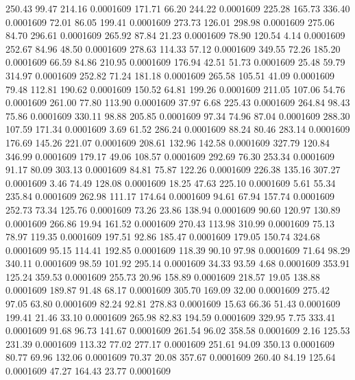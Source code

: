  250.43   99.47  214.16   0.0001609
 171.71   66.20  244.22   0.0001609
 225.28  165.73  336.40   0.0001609
  72.01   86.05  199.41   0.0001609
 273.73  126.01  298.98   0.0001609
 275.06   84.70  296.61   0.0001609
 265.92   87.84   21.23   0.0001609
  78.90  120.54    4.14   0.0001609
 252.67   84.96   48.50   0.0001609
 278.63  114.33   57.12   0.0001609
 349.55   72.26  185.20   0.0001609
  66.59   84.86  210.95   0.0001609
 176.94   42.51   51.73   0.0001609
  25.48   59.79  314.97   0.0001609
 252.82   71.24  181.18   0.0001609
 265.58  105.51   41.09   0.0001609
  79.48  112.81  190.62   0.0001609
 150.52   64.81  199.26   0.0001609
 211.05  107.06   54.76   0.0001609
 261.00   77.80  113.90   0.0001609
  37.97    6.68  225.43   0.0001609
 264.84   98.43   75.86   0.0001609
 330.11   98.88  205.85   0.0001609
  97.34   74.96   87.04   0.0001609
 288.30  107.59  171.34   0.0001609
   3.69   61.52  286.24   0.0001609
  88.24   80.46  283.14   0.0001609
 176.69  145.26  221.07   0.0001609
 208.61  132.96  142.58   0.0001609
 327.79  120.84  346.99   0.0001609
 179.17   49.06  108.57   0.0001609
 292.69   76.30  253.34   0.0001609
  91.17   80.09  303.13   0.0001609
  84.81   75.87  122.26   0.0001609
 226.38  135.16  307.27   0.0001609
   3.46   74.49  128.08   0.0001609
  18.25   47.63  225.10   0.0001609
   5.61   55.34  235.84   0.0001609
 262.98  111.17  174.64   0.0001609
  94.61   67.94  157.74   0.0001609
 252.73   73.34  125.76   0.0001609
  73.26   23.86  138.94   0.0001609
  90.60  120.97  130.89   0.0001609
 266.86   19.94  161.52   0.0001609
 270.43  113.98  310.99   0.0001609
  75.13   78.97  119.35   0.0001609
 197.51   92.86  185.47   0.0001609
 179.05  150.74  324.68   0.0001609
  95.15  114.41  192.85   0.0001609
 118.39   90.10   97.98   0.0001609
  71.64   98.29  340.11   0.0001609
  98.59  101.92  295.14   0.0001609
  34.33   93.59    4.68   0.0001609
 353.91  125.24  359.53   0.0001609
 255.73   20.96  158.89   0.0001609
 218.57   19.05  138.88   0.0001609
 189.87   91.48   68.17   0.0001609
 305.70  169.09   32.00   0.0001609
 275.42   97.05   63.80   0.0001609
  82.24   92.81  278.83   0.0001609
  15.63   66.36   51.43   0.0001609
 199.41   21.46   33.10   0.0001609
 265.98   82.83  194.59   0.0001609
 329.95    7.75  333.41   0.0001609
  91.68   96.73  141.67   0.0001609
 261.54   96.02  358.58   0.0001609
   2.16  125.53  231.39   0.0001609
 113.32   77.02  277.17   0.0001609
 251.61   94.09  350.13   0.0001609
  80.77   69.96  132.06   0.0001609
  70.37   20.08  357.67   0.0001609
 260.40   84.19  125.64   0.0001609
  47.27  164.43   23.77   0.0001609
